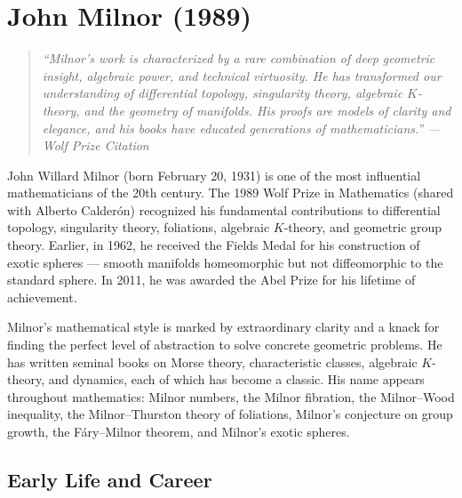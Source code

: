 \let\R\relax
\newcommand{\R}{\mathbb{R}}
\let\C\relax
\newcommand{\C}{\mathbb{C}}
\let\N\relax
\newcommand{\N}{\mathbb{N}}
\let\Z\relax
\newcommand{\Z}{\mathbb{Z}}
\let\Q\relax
\newcommand{\Q}{\mathbb{Q}}
\let\SO\relax
\newcommand{\SO}{\operatorname{SO}}
\let\SL\relax
\newcommand{\SL}{\operatorname{SL}}
\let\GL\relax
\newcommand{\GL}{\operatorname{GL}}
\let\St\relax
\newcommand{\St}{\operatorname{St}}
\let\GV\relax
\newcommand{\GV}{\operatorname{GV}}
\let\E\relax
\newcommand{\E}{\operatorname{E}}

\chapter{John Milnor (1989)}

\begin{quote}
\it ``Milnor's work is characterized by a rare combination of deep geometric insight, algebraic power, and technical virtuosity. He has transformed our understanding of differential topology, singularity theory, algebraic \(K\)-theory, and the geometry of manifolds. His proofs are models of clarity and elegance, and his books have educated generations of mathematicians.'' --- Wolf Prize Citation
\end{quote}

John Willard Milnor (born February 20, 1931) is one of the most influential mathematicians of the 20th century. The 1989 Wolf Prize in Mathematics (shared with Alberto Calder\'on) recognized his fundamental contributions to differential topology, singularity theory, foliations, algebraic \(K\)-theory, and geometric group theory. Earlier, in 1962, he received the Fields Medal for his construction of exotic spheres --- smooth manifolds homeomorphic but not diffeomorphic to the standard sphere. In 2011, he was awarded the Abel Prize for his lifetime of achievement.

Milnor's mathematical style is marked by extraordinary clarity and a knack for finding the perfect level of abstraction to solve concrete geometric problems. He has written seminal books on Morse theory, characteristic classes, algebraic \(K\)-theory, and dynamics, each of which has become a classic. His name appears throughout mathematics: Milnor numbers, the Milnor fibration, the Milnor--Wood inequality, the Milnor--Thurston theory of foliations, Milnor's conjecture on group growth, the F\'ary--Milnor theorem, and Milnor's exotic spheres.

\section{Early Life and Career}

